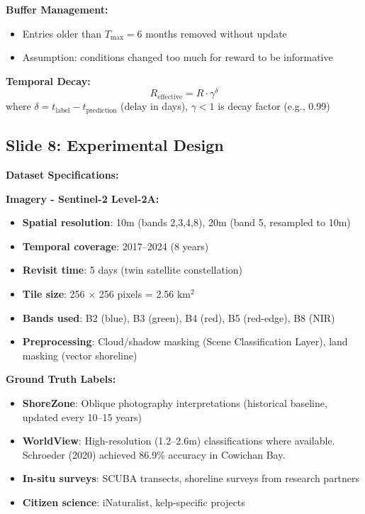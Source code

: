 \documentclass[11pt]{article}
\begin{document}
\textbf{Buffer Management:}
\begin{itemize}
    \item Entries older than $T_{\text{max}} = 6$ months removed without update
    \item Assumption: conditions changed too much for reward to be informative
\end{itemize}

\textbf{Temporal Decay:}
\[
R_{\text{effective}} = R \cdot \gamma^{\delta}
\]
where $\delta = t_{\text{label}} - t_{\text{prediction}}$ (delay in days), $\gamma < 1$ is decay factor (e.g., 0.99)

\subsection{Slide 8: Experimental Design}

\textbf{Dataset Specifications:}

\textbf{Imagery - Sentinel-2 Level-2A:}
\begin{itemize}
    \item \textbf{Spatial resolution}: 10m (bands 2,3,4,8), 20m (band 5, resampled to 10m)
    \item \textbf{Temporal coverage}: 2017--2024 (8 years)
    \item \textbf{Revisit time}: 5 days (twin satellite constellation)
    \item \textbf{Tile size}: 256 $\times$ 256 pixels = 2.56 km$^2$
    \item \textbf{Bands used}: B2 (blue), B3 (green), B4 (red), B5 (red-edge), B8 (NIR)
    \item \textbf{Preprocessing}: Cloud/shadow masking (Scene Classification Layer), land masking (vector shoreline)
\end{itemize}

\textbf{Ground Truth Labels:}
\begin{itemize}
    \item \textbf{ShoreZone}: Oblique photography interpretations (historical baseline, updated every 10--15 years)
    \item \textbf{WorldView}: High-resolution (1.2--2.6m) classifications where available. Schroeder (2020) achieved 86.9\% accuracy in Cowichan Bay.
    \item \textbf{In-situ surveys}: SCUBA transects, shoreline surveys from research partners
    \item \textbf{Citizen science}: iNaturalist, kelp-specific projects
\end{itemize}
\end{document}

